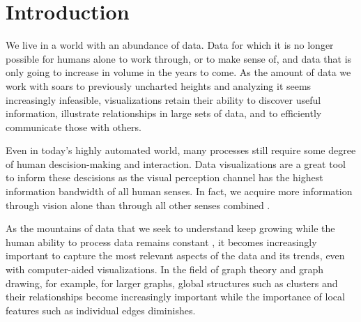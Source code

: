 \chapter{Introduction}
\label{chap:introduction}

We live in a world with an abundance of data. Data for which it is no longer possible for humans alone to work through, or to make sense of, and data that is only going to increase in volume in the years to come. As the amount of data we work with soars to previously uncharted heights and analyzing it seems increasingly infeasible, visualizations retain their ability to discover useful information, illustrate relationships in large sets of data, and to efficiently communicate those with others.

Even in today's highly automated world, many processes still require some degree of human descision-making and interaction. Data visualizations are a great tool to inform these descisions as the visual perception channel has the highest information bandwidth of all human senses. In fact, we acquire more information through vision alone than through all other senses combined \cite{ware2019information}.

As the mountains of data that we seek to understand keep growing while the human ability to process data remains constant \cite{dachsbacher2019visualisierung}, it becomes increasingly important to capture the most relevant aspects of the data and its trends, even with computer-aided visualizations. In the field of graph theory and graph drawing, for example, for larger graphs, global structures such as clusters and their relationships become increasingly important while the importance of local features such as  individual edges diminishes.





